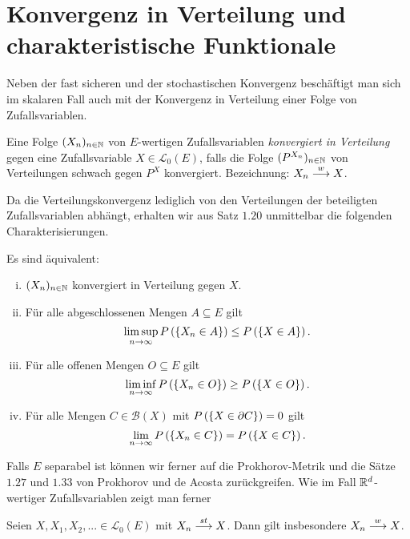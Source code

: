 \section{Konvergenz in Verteilung und charakteristische Funktionale}
Neben der fast sicheren und der stochastischen Konvergenz beschäftigt man sich im skalaren Fall auch mit der Konvergenz in Verteilung einer Folge von Zufallsvariablen. 
\begin{mydef}
    Eine Folge $(X_n)_{n \in \mathbb{N}}$ von $E$-wertigen Zufallsvariablen \textit{konvergiert in Verteilung} gegen eine Zufallsvariable $X \in \mathcal{L}_0(E)$,
    falls die Folge $(P^{X_n})_{n \in \mathbb{N}}$ von Verteilungen schwach gegen $P^X$ konvergiert. 
    \newline 
    Bezeichnung: $X_n \overset{w}{\longrightarrow} X$. 
\end{mydef}

Da die Verteilungskonvergenz lediglich von den Verteilungen der beteiligten Zufallsvariablen abhängt, erhalten wir aus Satz $1.20$ unmittelbar die folgenden Charakterisierungen.
\begin{proposition}
    Es sind äquivalent:
    \begin{enumerate}[(i)]
        \item $(X_n)_{n \in \mathbb{N}}$ konvergiert in Verteilung gegen $X$. 
        \item Für alle abgeschlossenen Mengen $A \subseteq E$ gilt 
        $$
            \limsup_{n \to \infty}P\left(\left\{ X_n \in A \right\}\right) \leq P\left(\left\{ X \in A \right\}\right).
        $$
        \item Für alle offenen Mengen $O \subseteq E$ gilt
        $$
            \liminf_{n \to \infty}P\left(\left\{ X_n \in O \right\}\right) \geq P\left(\left\{ X \in O \right\}\right).
        $$
        \item Für alle Mengen $C \in \mathcal{B}(X)$ mit $P\left(\left\{ X \in \partial C \right\}\right) = 0$ gilt 
        $$
            \lim_{n \to \infty}P\left(\left\{ X_n \in C \right\}\right) = P\left(\left\{ X \in C \right\}\right). 
        $$
    \end{enumerate}
\end{proposition}

Falls $E$ separabel ist können wir ferner auf die Prokhorov-Metrik und die Sätze $1.27$ und $1.33$ von Prokhorov und de Acosta zurückgreifen. Wie im Fall $\mathbb{R}^d$-wertiger Zufallsvariablen zeigt man ferner 
\begin{proposition}
    Seien $X,X_1,X_2,... \in \mathcal{L}_0(E)$ mit $X_n \overset{st}{\longrightarrow} X$. Dann gilt insbesondere $X_n \overset{w}{\longrightarrow} X$. 
\end{proposition}\ 
\newline




